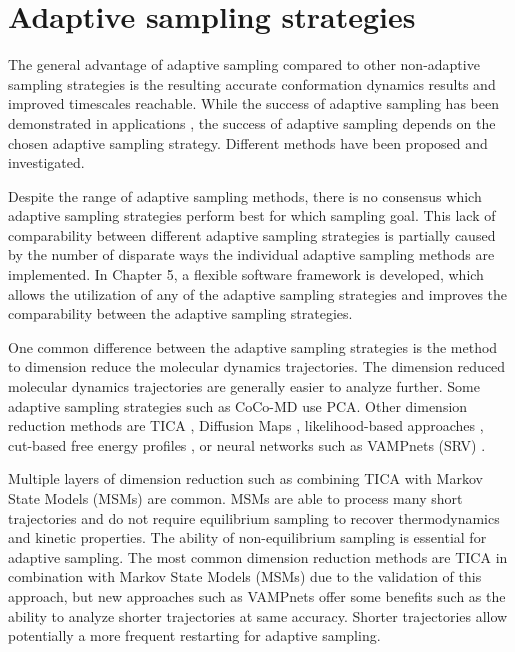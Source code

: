 \section{\label{sec:intro2}Adaptive sampling strategies}
The general advantage of adaptive sampling compared to other non-adaptive sampling strategies is the resulting accurate conformation dynamics results and improved timescales reachable. While the success of adaptive sampling has been demonstrated in applications \cite{Wieczorek2016,Plattner20171005,Kohlhoff201415}, the success of adaptive sampling depends on the chosen adaptive sampling strategy. Different methods have been proposed and investigated\cite{Fabritiis-2014,
AdaptivePELE-Lecina2017, preto2014fast, doerr2016htmd,
weexplore, prattWESTPAAdvancesSampling2018, Adstrategies2018, FUNN, FAST, harada2015jctc, singhal2005error, bowman2010enhanced,
weber2011characterization,  EvolutionCoupling-Shamsi2017, FAST-Bowman-2015, 
Strategies-erros-reduce, plattner2017complete, WESTPA-Zwier2015}. 

Despite the range of adaptive sampling methods, there is no consensus which adaptive sampling strategies perform best for which sampling goal. This lack of comparability between different adaptive sampling strategies is partially caused by the number of disparate ways the individual adaptive sampling methods are implemented. In Chapter 5, a flexible software framework is developed, which allows the utilization of any of the adaptive sampling strategies and improves the comparability between the adaptive sampling strategies.

One common difference between the adaptive sampling strategies is the method to dimension reduce the molecular dynamics trajectories. The dimension reduced molecular dynamics trajectories are generally easier to analyze further.
Some adaptive sampling strategies such as CoCo-MD\cite{shkurti2019jctc,harada2015jctc,harada2017jctc} use PCA. Other dimension reduction methods are TICA\cite{TICA1-perez2013, TICA2-schwantes2013}
, Diffusion Maps \cite{Coifman7426, rohrdanz2011determination,Zheng2011, Boninsegna2015},
likelihood-based approaches \cite{peters2006obtaining}, cut-based free energy
profiles \cite{krivov2008diffusive}, or neural networks such as VAMPnets (SRV)
\cite{Mardt2018,wehmeyer2018time, ribeiro2018reweighted, chen2019jcp}. 

Multiple layers of dimension reduction such as combining TICA with Markov State Models (MSMs) \cite{prinz2011markov,
MSM-Pande-2018,bookmsm,masterequationsMSM,SCHUTTE1999146} are common. MSMs are able to process many short trajectories and
do not require equilibrium sampling to recover thermodynamics and kinetic properties. The ability of non-equilibrium sampling is essential for adaptive sampling.
The most common dimension reduction methods are TICA in combination with Markov State Models (MSMs) due to the validation of this approach, but new approaches such as VAMPnets offer some benefits such as the ability to analyze shorter trajectories at same accuracy. Shorter trajectories allow potentially a more frequent restarting for adaptive sampling.

